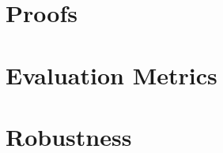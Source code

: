 \section{Proofs}


\section{Evaluation Metrics}\label{app:metrics}

\section{Robustness}\label{app:Robustness}

